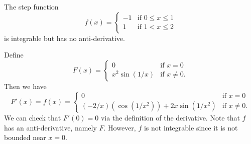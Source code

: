 \begin{example}
  The step function
  \[
    f(x) =
    \begin{cases}
      -1 & \text{if } 0 \le x \le 1 \\
      1 & \text{if } 1 < x \le 2
    \end{cases}
  \]
  is integrable but has no anti-derivative.
\end{example}

\begin{example}
  Define
  \[
    F(x) =
    \begin{cases}
      0 & \text{if } x = 0 \\
      x^2 \sin(1/x) & \text{if } x \ne 0.
    \end{cases}
  \]
  Then we have
  \[
    F'(x) = f(x) =
    \begin{cases}
      0 & \text{if } x = 0 \\
      (-2 / x)(\cos(1 / x^2)) + 2x \sin(1 / x^2) & \text{if } x \ne 0.
    \end{cases}
  \]
  We can check that $F'(0) = 0$ via the definition
  of the derivative. Note that $f$ has an anti-derivative,
  namely $F$. However, $f$ is not integrable since
  it is not bounded near $x = 0$.
\end{example}
